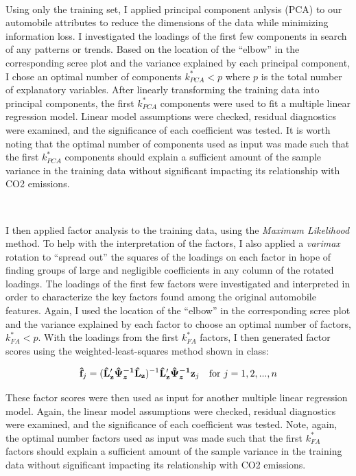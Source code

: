 \documentclass[11pt]{article}
\begin{document}
\

Using only the training set, I applied principal component anlysis (PCA) to our automobile attributes to reduce the dimensions of the data while minimizing information loss. I investigated the loadings of the first few components in search of any patterns or trends. Based on the location of the ``elbow'' in the corresponding scree plot and the variance explained by each principal component, I chose an optimal number of components $k_{PCA}^* < p$ where $p$ is the total number of explanatory variables. After linearly
transforming the training data into principal components, the first $k_{PCA}^*$ components were used to fit a multiple linear regression model. Linear model assumptions were checked, residual diagnostics were examined, and the significance of each coefficient was tested. It is worth noting that the optimal number of components used as input was made such that the first $k_{PCA}^*$ components should explain a sufficient amount of the sample variance in the training data without significant impacting its relationship with CO2 emissions.

\

I then applied factor analysis to the training data, using the \textit{Maximum Likelihood} method. To help with the interpretation of the factors, I also applied a \textit{varimax} rotation to ``spread out'' the squares of the loadings on each factor in hope of finding groups of large and negligible coefficients in any column of the rotated loadings. The loadings of the first few factors were investigated and interpreted in order to characterize the key factors found among the original automobile features. Again, I used the location of the ``elbow'' in the corresponding scree plot and the variance explained by each factor to choose an optimal number of factors, $k_{FA}^* < p$. With the loadings from the first $k_{FA}^*$ factors, I then generated factor scores using the weighted-least-squares method shown in class:

$$\mathbf{\hat{f}}_j = (\mathbf{\hat{L}_z}'\boldsymbol{\hat{\Psi}_{z}^{-1}}\mathbf{\hat{L}_z})^{-1}\mathbf{\hat{L}_z}'\boldsymbol{\hat{\Psi}_z^{-1}}\mathbf{z}_j \text{\quad for } j = 1, 2, ..., n$$

These factor scores were then used as input for another multiple linear regression model. Again, the linear model assumptions were checked, residual diagnostics were examined, and the significance of each coefficient was tested. Note, again, the optimal number factors used as input was made such that the first $k_{FA}^*$ factors should explain a sufficient amount of the sample variance in the training data without significant impacting its relationship with CO2 emissions.
\end{document}
